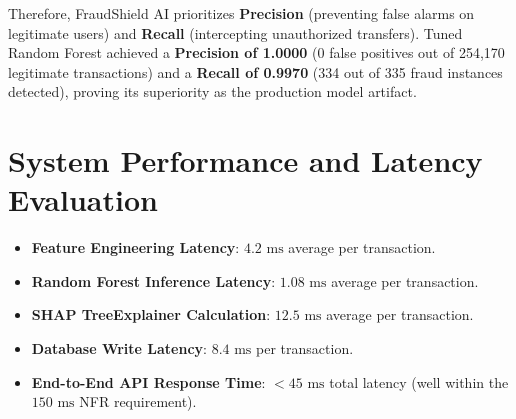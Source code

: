 Therefore, FraudShield AI prioritizes \textbf{Precision} (preventing false alarms on legitimate users) and \textbf{Recall} (intercepting unauthorized transfers). Tuned Random Forest achieved a \textbf{Precision of 1.0000} (0 false positives out of 254,170 legitimate transactions) and a \textbf{Recall of 0.9970} (334 out of 335 fraud instances detected), proving its superiority as the production model artifact.

\section{System Performance and Latency Evaluation}
\begin{itemize}
    \item \textbf{Feature Engineering Latency}: $4.2\text{ ms}$ average per transaction.
    \item \textbf{Random Forest Inference Latency}: $1.08\text{ ms}$ average per transaction.
    \item \textbf{SHAP TreeExplainer Calculation}: $12.5\text{ ms}$ average per transaction.
    \item \textbf{Database Write Latency}: $8.4\text{ ms}$ per transaction.
    \item \textbf{End-to-End API Response Time}: $< 45\text{ ms}$ total latency (well within the $150\text{ ms}$ NFR requirement).
\end{itemize}
